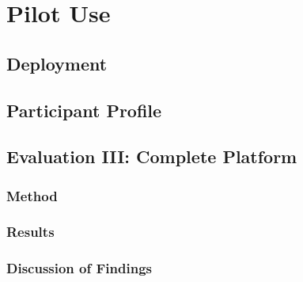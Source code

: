 \chapter{Pilot Use}
\section{Deployment}
\section{Participant Profile}
\section{Evaluation III: Complete Platform}
\subsection{Method}
\subsection{Results}
\subsection{Discussion of Findings}



